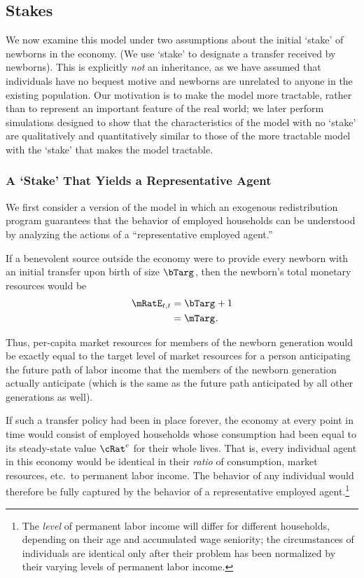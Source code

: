 \documentclass{\handout}
\begin{document}
\subsection{Stakes}

We now examine this model under two assumptions about the initial
`stake' of newborns in the economy.  (We use `stake' to designate a
transfer received by newborns).  This is explicitly {\it not} an
inheritance, as we have assumed that individuals have no bequest
motive and newborns are unrelated to anyone in the existing
population.  Our motivation is to make the model more tractable,
rather than to represent an important feature of the real world; we
later perform simulations designed to show that the characteristics of
the model with no `stake' are qualitatively and quantitatively similar
to those of the more tractable model with the `stake' that makes the
model tractable.

\subsubsection{A `Stake' That Yields a Representative Agent}

We first consider a version of the model in which an exogenous
redistribution program guarantees that the behavior of employed households can 
be understood by analyzing the actions of a ``representative employed agent.''  

If a benevolent source outside the economy were to provide every newborn with an initial
transfer upon birth of size $\bTarg^{\hideSup}$, then the newborn's total monetary resources 
would be
\begin{equation*}\begin{gathered}\begin{aligned}
  \mRatE_{t,t} & =  \bTarg^{\hideSup} + 1
\\ & =  \mTarg^{\hideSup} 
.
\end{aligned}\end{gathered}\end{equation*}

Thus, per-capita market resources for members of the newborn generation
would be exactly equal to the target level of market resources for a
person anticipating the future path of labor income that the members of the newborn
generation actually anticipate (which is the same as the future path
anticipated by all other generations as well).

If such a transfer policy had been in place forever, the economy at every 
point in time would consist of employed households whose consumption had 
been equal to its steady-state value ${\cRat}^{e}$ for their whole lives.  That is, every 
individual agent in this economy would be identical in their {\it ratio} of consumption,
market resources, etc.\ to permanent labor income.  
The behavior of any individual would therefore be fully captured by the behavior
of a representative employed agent.\footnote{The {\it level} of permanent 
labor income will differ for different households, depending on their age
and accumulated wage seniority; the circumstances of individuals are identical
only after their problem has been normalized by their varying levels of permanent 
labor income.}
\end{document}
